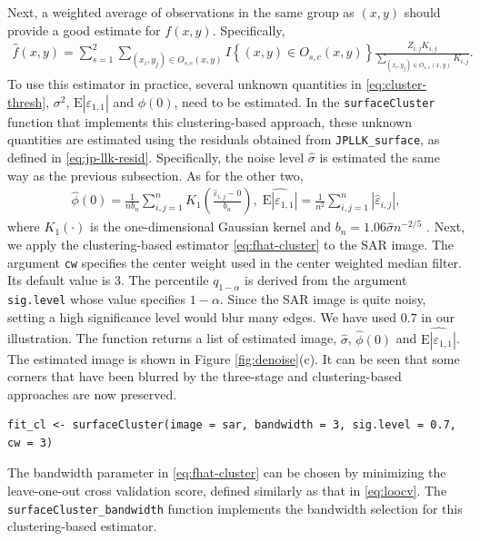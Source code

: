 Next, a weighted average of observations in the same group as \((x, y)\) should provide a good estimate for \(f(x, y)\). Specifically,
\begin{align}
  \label{eq:fhat-cluster}
  \widehat{f}(x, y) = \sum_{s=1}^2  \sum_{(x_i, y_j) \in O_{s, c}(x, y)} I\left\{ (x, y) \in O_{s, c}(x, y) \right\} \frac{Z_{i, j} K_{i, j}}{\sum_{(x_i, y_j) \in O_{s, c}(x, y)} K_{i, j}}.
\end{align}
To use this estimator in practice, several unknown quantities in \eqref{eq:cluster-thresh}, \(\sigma^2\), \(\mathrm{E}|\varepsilon_{1, 1}|\) and \(\phi(0)\), need to be estimated. In the \texttt{surfaceCluster} function that implements this clustering-based approach, these unknown quantities are estimated using the residuals obtained from \texttt{JPLLK\_surface}, as defined in \eqref{eq:jp-llk-resid}. Specifically, the noise level \(\widehat{\sigma}\) is estimated the same way as the previous subsection. As for the other two,
\begin{align*}
  \widehat{\phi}(0) = \frac{1}{nb_n} \sum_{i, j = 1}^n K_1\left( \frac{\widehat{\varepsilon}_{i, j} - 0}{b_n} \right), \; \widehat{\mathrm{E}|\varepsilon_{1, 1}|} = \frac{1}{n^2} \sum_{i, j = 1}^n \left| \widehat{\varepsilon}_{i, j} \right|,
\end{align*}
where \(K_1(\cdot)\) is the one-dimensional Gaussian kernel and \(b_n = 1.06\widehat{\sigma}n^{-2/5}\) \citep{wand1994kernel}. Next, we apply the clustering-based estimator \eqref{eq:fhat-cluster} to the SAR image. The argument \texttt{cw} specifies the center weight used in the center weighted median filter. Its default value is \(3\). The percentile \(q_{1 - \alpha}\) is derived from the argument \texttt{sig.level} whose value specifies \(1- \alpha\). Since the SAR image is quite noisy, setting a high significance level would blur many edges. We have used \(0.7\) in our illustration. The function returns a list of estimated image, \(\widehat{\sigma}\), \(\widehat{\phi}(0)\) and \(\widehat{\mathrm{E}|\varepsilon_{1, 1}|}\). The estimated image is shown in Figure \ref{fig:denoise}(c). It can be seen that some corners that have been blurred by the three-stage and clustering-based approaches are now preserved.

\begin{verbatim}
fit_cl <- surfaceCluster(image = sar, bandwidth = 3, sig.level = 0.7, cw = 3)
\end{verbatim}

The bandwidth parameter in \eqref{eq:fhat-cluster} can be chosen by minimizing the leave-one-out cross validation score, defined similarly as that in \eqref{eq:loocv}. The \texttt{surfaceCluster\_bandwidth} function implements the bandwidth selection for this clustering-based estimator.

